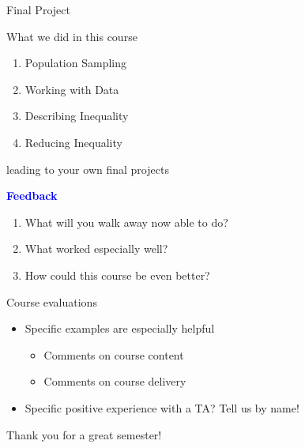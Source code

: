 \documentclass{beamer}
\newcommand\bblue[1]{\textcolor{blue}{\textbf{#1}}}
\begin{document}

\begin{frame}
\huge Final Project
\end{frame}

\begin{frame}{What we did in this course}
\begin{enumerate}
\item Population Sampling
\item Working with Data
\item Describing Inequality
\item Reducing Inequality
\end{enumerate}
leading to your own final projects
\end{frame}

\begin{frame}{\bblue{Feedback} }

\large 
\begin{enumerate}
\item What will you walk away now able to do?
\item What worked especially well?
\item How could this course be even better?
\end{enumerate}
\end{frame}

\begin{frame}{Course evaluations} \pause

\begin{itemize}
\item Specific examples are especially helpful
\begin{itemize}
\item Comments on course content
\item Comments on course delivery
\end{itemize} \pause
\item Specific positive experience with a TA? Tell us by name!
\end{itemize}

\end{frame}

\begin{frame}
\huge Thank you for a great semester!
\end{frame}
\end{document}
